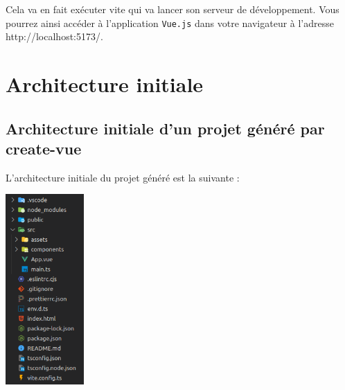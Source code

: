 \documentclass{article}
\begin{document}
Cela va en fait exécuter {\color{monOrange}vite} qui va lancer son serveur de développement. Vous pourrez ainsi accéder à l'application {\tt Vue.js} dans votre navigateur à l'adresse {\color{monOrange} http://localhost:5173/}.

\section{Architecture initiale}
\subsection{Architecture initiale d'un projet généré par create-vue}
L'architecture initiale du projet généré est la suivante :
\begin{center}
\includegraphics[width=3cm]{images/image05.png}
\end{center}
\end{document}
